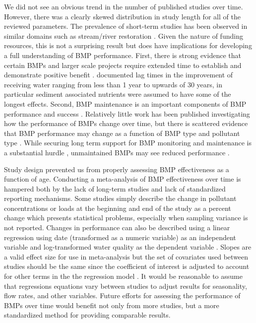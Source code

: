 \documentclass[utf8]{FrontiersinHarvard}
\begin{document}
We did not see an obvious trend in the number of published studies over time.
However, there was a clearly skewed distribution in study length for all of the reviewed parameters.
The prevalence of short-term studies has been observed in similar domains such as stream/river restoration \citep{bernhardtSynthesizingRiverRestoration2005}.
Given the nature of funding resources, this is not a surprising result but does have implications for developing a full understanding of BMP performance.
First, there is strong evidence that certain BMPs and larger scale projects require extended time to establish and demonstrate positive benefit \citep{mealsLagTimeWater2010, grudzinskiDoesRiparianFencing2020}.
\citet{mealsLagTimeWater2010} documented lag times in the improvement of receiving water ranging from less than 1 year to upwards of 30 years, in particular sediment associated nutrients were assumed to have some of the longest effects.
Second, BMP maintenance is an important components of BMP performance and success \citep{kochNitrogenRemovalStormwater2014, heidariGreenStormwaterInfrastructure2023}.
Relatively little work has been published investigating how the performance of BMPs change over time, but there is scattered evidence that BMP performance may change as a function of BMP type and pollutant type \citep{liuReviewEffectivenessBest2017}.
While securing long term support for BMP monitoring and maintenance is a substantial hurdle \citep{heidariGreenStormwaterInfrastructure2023}, unmaintained BMPs may see reduced performance \citep{kochNitrogenRemovalStormwater2014, liuReviewEffectivenessBest2017}.

Study design prevented us from properly assessing BMP effectiveness as a function of age.
Conducting a meta-analysis of BMP effectiveness over time is hampered both by the lack of long-term studies and lack of standardized reporting mechanisms.
Some studies simply describe the change in pollutant concentrations or loads at the beginning and end of the study as a percent change \citep{haileHydraulicPerformancePollutant2016} which presents statistical problems, especially when sampling variance is not reported.
Changes in performance can also be described using a linear regression using date (transformed as a numeric variable) as an independent variable and log-transformed water quality as the dependent variable \citep{mitschCreatingWetlandsPrimary2012, mitschValidationEcosystemServices2014, pausAssessmentHydraulicToxic2014}.
Slopes are a valid effect size for use in meta-analysis but the set of covariates used between studies should be the same since the coefficient of interest is adjusted to account for other terms in the the regression model \citep{beckerSynthesisRegressionSlopes2007}.
It would be reasonable to assume that regressions equations vary between studies to adjust results for seasonality, flow rates, and other variables.
Future efforts for assessing the performance of BMPs over time would benefit not only from more studies, but a more standardized method for providing comparable results.
\end{document}
